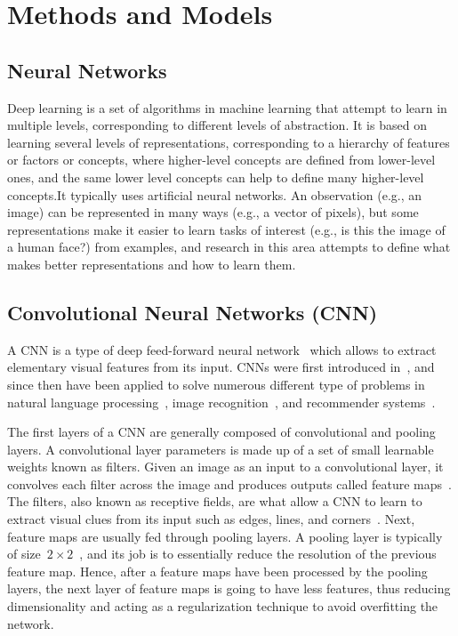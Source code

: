 \section{Methods and Models}

\subsection{Neural Networks}
Deep learning is a set of algorithms in machine learning that attempt to learn in multiple levels, corresponding to different levels of abstraction. It is based on learning several levels of representations, corresponding to a hierarchy of features or factors or concepts, where higher-level concepts are defined from lower-level ones, and the same lower level concepts can help to define many higher-level concepts.It typically uses artificial neural networks. An observation (e.g., an image) can be represented in many ways (e.g., a vector of pixels), but some representations make it easier to learn tasks of interest (e.g., is this the image of a human face?) from examples, and research in this area attempts to define what makes better representations and how to learn them\cite{DeepLearning}.

\subsection{Convolutional Neural Networks (CNN)}

A CNN is a type of deep feed-forward neural network~\cite{cnn-star-galaxy} which allows to extract elementary visual features from its input. CNNs were first introduced in~\cite{Lecun99objectrecognition}, and since then have been applied to solve numerous different type of problems in  natural language processing~\cite{Collobert:2008:UAN:1390156.1390177}, image recognition~\cite{cnn-star-galaxy}, and recommender systems~\cite{NIPS2013_5004}.

The first layers of a CNN are generally composed of convolutional and pooling layers. A convolutional layer parameters is made up of a set of small learnable weights known as filters. Given an image as an input to a convolutional layer, it convolves each filter across the image and produces outputs called feature maps~\cite{cnn-star-galaxy}. The filters, also known as receptive fields, are what allow a CNN to learn to extract visual clues from its input such as edges, lines, and corners~\cite{Lecun99objectrecognition}. Next, feature maps are usually fed through pooling layers. A pooling layer is typically of size~$2 \times 2$~\cite{NIPS2012_4824}, and  its job is to essentially reduce the resolution of the previous feature map. Hence, after a feature maps have been processed by the pooling layers, the next layer of feature maps is going to have less features, thus reducing dimensionality and acting as a regularization technique to avoid overfitting the network.

